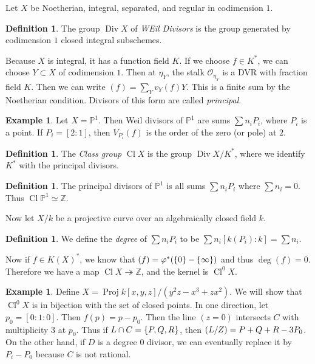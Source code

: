 \documentclass[leqno, openany]{memoir}
\theoremstyle{definition}
\newtheorem{defn}[thm]{Definition}
\newtheorem{exm}[thm]{Example}
\theoremstyle{remark}
\theoremstyle{plain}
\theoremstyle{definition}
\theoremstyle{remark}
\newcommand{\Z}{\mathbb{Z}}
\renewcommand{\P}{\mathbb{P}}
\newcommand{\mc}[1]{\mathcal{#1}}
\DeclareMathOperator{\Cl}{Cl}
\DeclareMathOperator{\Proj}{Proj}
\begin{document}
Let $X$ be Noetherian, integral, separated, and regular in codimension $1$.

\begin{defn}
    The group $\operatorname{Div} X$ of \textit{WEil Divisors} is the group generated by codimension $1$ closed integral subschemes. 
\end{defn}

Because $X$ is integral, it has a function field $K$. If we choose $f \in K^*$, we can choose $Y \subset X$ of codimension $1$. Then at $\eta_Y$, the stalk $\mc{O}_{\eta_Y}$ is a DVR with fraction field $K$. Then we can write $(f) = \sum_Y v_Y(f) Y$. This is a finite sum by the Noetherian condition. Divisors of this form are called \textit{principal}. 

\begin{exm}
    Let $X =\P^1$. Then Weil divisors of $\P^1$ are sums $\sum n_i P_i$, where $P_i$ is a point. If $P_i = [2:1]$, then $V_{P_i}(f)$ is the order of the zero (or pole) at $2$.
\end{exm}

\begin{defn}
    The \textit{Class group} $\operatorname{Cl} X$ is the group $\operatorname{Div} X / K^*$, where we identify $K^*$ with the principal divisors. 
\end{defn}

\begin{defn}
    The principal divisors of $\P^1$ is all sums $\sum n_i P_i$ where $\sum n_i = 0$. Thus $\operatorname{Cl} \P^1 \simeq \Z$.
\end{defn}

Now let $X/k$ be a projective curve over an algebraically closed field $k$.

\begin{defn}
    We define the \textit{degree} of $\sum n_i P_i$ to be $\sum n_i [k(P_i):k] = \sum n_i$.
\end{defn}

Now if $f \in K(X)^*$, we know that $(f) = \varphi^*(\qty{0} - \qty{\infty})$ and thus $\deg (f) = 0$. Therefore we have a map $\operatorname{Cl} X \twoheadrightarrow \Z$, and the kernel is $\operatorname{Cl}^0 X$.

\begin{exm}
    Define $X = \Proj k[x,y,z] / (y^2 z - x^3 + zx^2)$. We will show that $\Cl^0 X$ is in bijection with the set of closed points. In one direction, let $p_0 = [0:1:0]$. Then $f(p) = p - p_0$. Then the line $(z=0)$ intersects $C$ with multiplicity $3$ at $p_0$. Thus if $L \cap C = \qty{P,Q,R}$, then $\qty(L/Z) = P + Q + R - 3 P_0$. On the other hand, if $D$ is a degree $0$ divisor, we can eventually replace it by $P_i - P_0$ because $C$ is not rational.
\end{exm}
\end{document}
